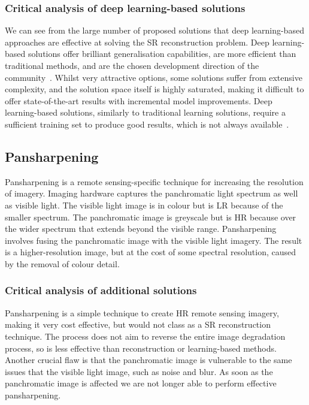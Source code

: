 \subsubsection{Critical analysis of deep learning-based solutions}
We can see from the large number of proposed solutions that deep learning-based approaches are effective at solving the SR reconstruction problem. Deep learning-based solutions offer brilliant generalisation capabilities, are more efficient than traditional methods, and are the chosen development direction of the community~\cite{ndsrgan}. Whilst very attractive options, some solutions suffer from extensive complexity, and the solution space itself is highly saturated, making it difficult to offer state-of-the-art results with incremental model improvements. Deep learning-based solutions, similarly to traditional learning solutions, require a sufficient training set to produce good results, which is not always available~\cite{superResRemoteSensingOverview}.

\subsection{Pansharpening}
Pansharpening is a remote sensing-specific technique for increasing the resolution of imagery. Imaging hardware captures the panchromatic light spectrum as well as visible light. The visible light image is in colour but is LR because of the smaller spectrum. The panchromatic image is greyscale but is HR because over the wider spectrum that extends beyond the visible range. Pansharpening involves fusing the panchromatic image with the visible light imagery. The result is a higher-resolution image, but at the cost of some spectral resolution, caused by the removal of colour detail.

\subsubsection{Critical analysis of additional solutions}
Pansharpening is a simple technique to create HR remote sensing imagery, making it very cost effective, but would not class as a SR reconstruction technique. The process does not aim to reverse the entire image degradation process, so is less effective than reconstruction or learning-based methods. Another crucial flaw is that the panchromatic image is vulnerable to the same issues that the visible light image, such as noise and blur. As soon as the panchromatic image is affected we are not longer able to perform effective pansharpening.

